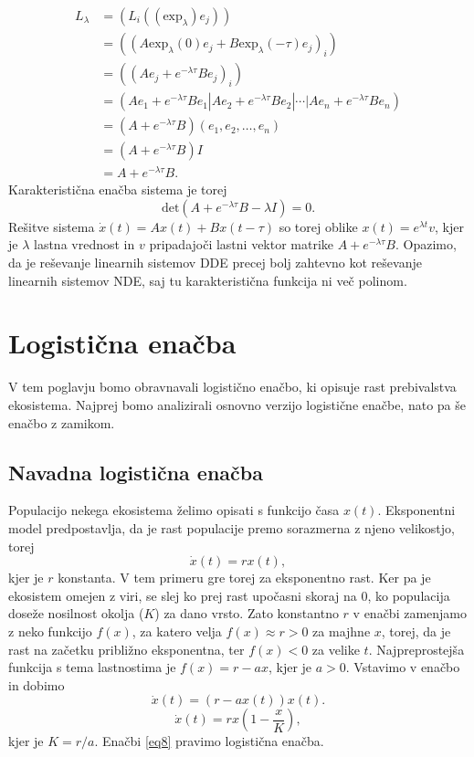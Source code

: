 \documentclass[12pt,a4paper]{amsart}
\theoremstyle{definition} %
\theoremstyle{plain} %
\newcommand{\okr}{\text{exp}_{\lambda}}
\begin{document}
\begin{equation*}
    \begin{split}
        L_\lambda &= (L_i((\okr)e_j)) \\
                &= ((A\okr(0)e_j+B\okr(-\tau)e_j)_i) \\
                &= ((Ae_j+e^{-\lambda\tau}Be_j)_i) \\
                &= (Ae_1+e^{-\lambda\tau}Be_1|Ae_2+e^{-\lambda\tau}Be_2|\cdots|Ae_n+e^{-\lambda\tau}Be_n) \\
                &= (A+e^{-\lambda\tau}B)(e_1,e_2,\dots,e_n) \\
                &= (A+e^{-\lambda\tau}B)I \\
                &= A+e^{-\lambda\tau}B.
    \end{split}
\end{equation*}
Karakteristična enačba sistema je torej
\[\text{det}(A+e^{-\lambda\tau}B-\lambda I)=0.\]
Rešitve sistema $\dot{x}(t)=Ax(t)+Bx(t-\tau)$ so torej oblike $x(t)=e^{\lambda t}v$, kjer je $\lambda$ lastna vrednost in $v$ pripadajoči lastni 
vektor matrike $A+e^{-\lambda\tau}B$. Opazimo, da je reševanje linearnih sistemov DDE precej bolj zahtevno kot
reševanje linearnih sistemov NDE, saj tu karakteristična funkcija ni več polinom.

\section{Logistična enačba}
V tem poglavju bomo obravnavali logistično enačbo, ki opisuje rast prebivalstva ekosistema. Najprej bomo analizirali 
osnovno verzijo logistične enačbe, nato pa še enačbo z zamikom.

\subsection{Navadna logistična enačba}
Populacijo nekega ekosistema želimo opisati s funkcijo časa $x(t)$. Eksponentni model predpostavlja, da je rast 
populacije premo sorazmerna z njeno velikostjo, torej
\[\dot{x}(t)=rx(t), \]
kjer je $r$ konstanta. V tem primeru gre torej za eksponentno rast. Ker pa je ekosistem omejen z viri, se slej ko 
prej rast upočasni skoraj na 0, ko populacija doseže nosilnost okolja ($K$) za dano vrsto. Zato konstantno $r$ v 
enačbi zamenjamo z neko funkcijo $f(x)$, za katero velja $f(x)\approx r>0$ za majhne $x$, torej, da je rast na začetku 
približno eksponentna, ter $f(x)<0$ za velike $t$. Najpreprostejša funkcija s tema lastnostima je $f(x)=r-ax$, 
kjer je $a>0$. Vstavimo v enačbo in dobimo
\[\dot{x}(t)=(r-ax(t))x(t).\]
\begin{equation} \label{eq8}
    \dot{x}(t) = rx\left(1-\frac{x}{K}\right),
\end{equation}
kjer je $K=r/a$. Enačbi \eqref{eq8} pravimo logistična enačba.
\end{document}
